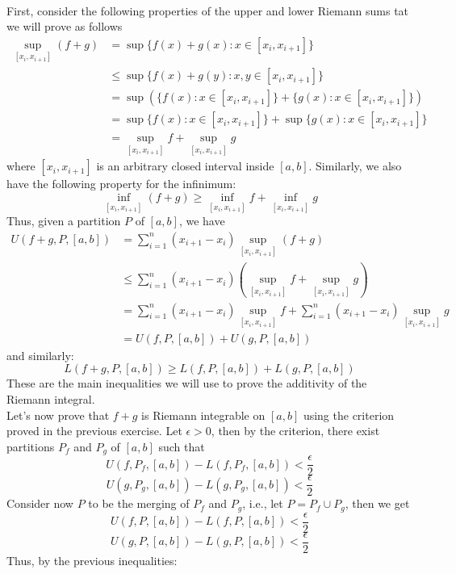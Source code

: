 \begin{solution}
    \\ First, consider the following properties of the upper and lower Riemann sums tat we will prove as follows
    \begin{align*}
        \sup_{[x_i, x_{i+1}]}(f+g) &= \sup \{f(x) + g(x) : x\in [x_i, x_{i+1}]\} \\
        &\leq \sup \{f(x) + g(y) : x, y\in [x_i, x_{i+1}]\} \\
        &= \sup(\{f(x) : x\in [x_i, x_{i+1}]\} + \{g(x) : x\in [x_i, x_{i+1}]\}) \\
        &= \sup\{f(x) : x\in [x_i, x_{i+1}]\} + \sup\{g(x) : x\in [x_i, x_{i+1}]\} \\
        &= \sup_{[x_i, x_{i+1}]}f + \sup_{[x_i, x_{i+1}]}g
    \end{align*}
    where $[x_i, x_{i+1}]$ is an arbitrary closed interval inside $[a,b]$. Similarly, we also have the following property for the infinimum:
    $$\inf_{[x_i, x_{i+1}]}(f+g) \geq \inf_{[x_i, x_{i+1}]}f + \inf_{[x_i, x_{i+1}]}g$$
    Thus, given a partition $P$ of $[a, b]$, we have
    \begin{align*}
        U(f+g, P, [a,b]) &= \sum_{i=1}^n (x_{i+1} - x_i)\sup_{[x_i, x_{i+1}]}(f+g) \\
        &\leq \sum_{i=1}^n (x_{i+1} - x_i)(\sup_{[x_i, x_{i+1}]}f + \sup_{[x_i, x_{i+1}]}g) \\
        &= \sum_{i=1}^n (x_{i+1} - x_i)\sup_{[x_i, x_{i+1}]}f + \sum_{i=1}^n (x_{i+1} - x_i)\sup_{[x_i, x_{i+1}]}g \\
        &= U(f, P, [a,b]) + U(g, P, [a,b])
    \end{align*}
    and similarly:
    $$L(f+g, P, [a,b]) \geq L(f, P, [a,b]) + L(g, P, [a,b])$$
    These are the main inequalities we will use to prove the additivity of the Riemann integral. \\
    Let's now prove that $f+g$ is Riemann integrable on $[a,b]$ using the criterion proved in the previous exercise.
    Let $\epsilon > 0$, then by the criterion, there exist partitions $P_f$ and $P_g$ of $[a,b]$ such that 
    $$U(f, P_f, [a,b]) - L(f, P_f, [a,b]) < \frac{\epsilon}{2}$$
    $$U(g, P_g, [a,b]) - L(g, P_g, [a,b]) < \frac{\epsilon}{2}$$
    Consider now $P$ to be the merging of $P_f$ and $P_g$, i.e., let $P = P_f \cup P_g$, then we get
    $$U(f, P, [a,b]) - L(f, P, [a,b]) < \frac{\epsilon}{2}$$
    $$U(g, P, [a,b]) - L(g, P, [a,b]) < \frac{\epsilon}{2}$$
    Thus, by the previous inequalities:
    \begin{align*}

\end{align*}
\end{solution}

